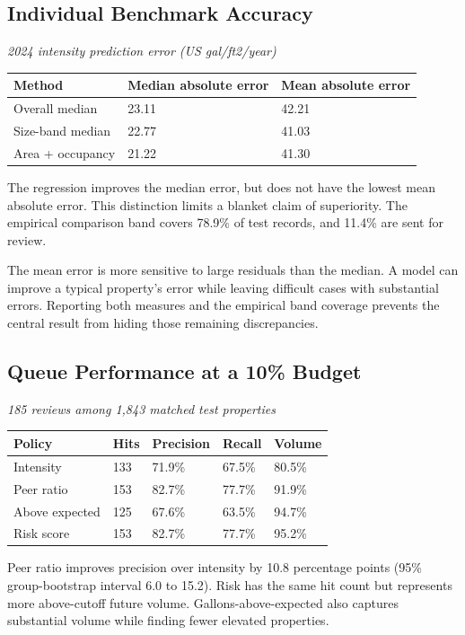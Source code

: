\documentclass[12pt,a4paper]{article}
\begin{document}
\subsection{Individual Benchmark Accuracy}
\begin{center}\small
\textit{2024 intensity prediction error (US gal/ft2/year)}\par\medskip
\begin{tabularx}{\textwidth}{XXX}
\toprule
\textbf{Method} & \textbf{Median absolute error} & \textbf{Mean absolute error}\\\midrule
Overall median & 23.11 & 42.21\\
Size-band median & 22.77 & 41.03\\
Area + occupancy & 21.22 & 41.30\\
\bottomrule\end{tabularx}\end{center}
The regression improves the median error, but does not have the lowest mean absolute error. This distinction limits a blanket claim of superiority. The empirical comparison band covers 78.9\% of test records, and 11.4\% are sent for review.

The mean error is more sensitive to large residuals than the median. A model can improve a typical property's error while leaving difficult cases with substantial errors. Reporting both measures and the empirical band coverage prevents the central result from hiding those remaining discrepancies.

\subsection{Queue Performance at a 10\% Budget}
\begin{center}\small
\textit{185 reviews among 1,843 matched test properties}\par\medskip
\begin{tabularx}{\textwidth}{XXXXX}
\toprule
\textbf{Policy} & \textbf{Hits} & \textbf{Precision} & \textbf{Recall} & \textbf{Volume}\\\midrule
Intensity & 133 & 71.9\% & 67.5\% & 80.5\%\\
Peer ratio & 153 & 82.7\% & 77.7\% & 91.9\%\\
Above expected & 125 & 67.6\% & 63.5\% & 94.7\%\\
Risk score & 153 & 82.7\% & 77.7\% & 95.2\%\\
\bottomrule\end{tabularx}\end{center}
Peer ratio improves precision over intensity by 10.8 percentage points (95\% group-bootstrap interval 6.0 to 15.2). Risk has the same hit count but represents more above-cutoff future volume. Gallons-above-expected also captures substantial volume while finding fewer elevated properties.
\end{document}
